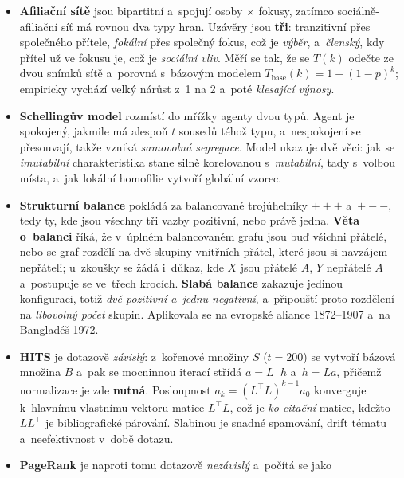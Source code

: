 \documentclass[11pt,a4paper]{article}
\theoremstyle{definition}
\begin{document}
\begin{itemize}
      \emph{Imutabilní} je pohlaví, rasa a~věk, \emph{mutabilní} je chování a~názory. Oba směry
      lze rozlišit jedině \emph{longitudinálními} studiemi; studie obezity (Christakis \&
      Fowler, 12\,000 lidí, 32 let) přinesla důkaz pro \emph{sociální vliv}.
\item \textbf{Afiliační sítě} jsou bipartitní a~spojují osoby $\times$ fokusy, zatímco
      sociálně-afiliační síť má rovnou dva typy hran. Uzávěry jsou \textbf{tři}: tranzitivní
      přes společného přítele, \emph{fokální} přes společný fokus, což je \emph{výběr},
      a~\emph{členský}, kdy přítel už ve fokusu je, což je \emph{sociální vliv}. Měří se tak, že
      se $T(k)$ odečte ze dvou snímků sítě a~porovná s~bázovým modelem
      $T_{\text{base}}(k)=1-(1-p)^k$; empiricky vychází velký nárůst z~1 na 2 a~poté
      \emph{klesající výnosy}.
\item \textbf{Schellingův model} rozmístí do mřížky agenty dvou typů. Agent je spokojený,
      jakmile má alespoň $t$ sousedů téhož typu, a~nespokojení se přesouvají, takže vzniká
      \emph{samovolná segregace}. Model ukazuje dvě věci: jak se \emph{imutabilní}
      charakteristika stane silně korelovanou s~\emph{mutabilní}, tady s~volbou místa, a~jak
      lokální homofilie vytvoří globální vzorec.
\item \textbf{Strukturní balance} pokládá za balancované trojúhelníky $+{+}{+}$ a~$+{-}{-}$,
      tedy ty, kde jsou všechny tři vazby pozitivní, nebo právě jedna. \textbf{Věta o~balanci}
      říká, že v~úplném balancovaném grafu jsou buď všichni přátelé, nebo se graf rozdělí na dvě
      skupiny vnitřních přátel, které jsou si navzájem nepřáteli; u~zkoušky se žádá i~důkaz, kde
      $X$ jsou přátelé $A$, $Y$ nepřátelé $A$ a~postupuje se ve~třech krocích. \textbf{Slabá
      balance} zakazuje jedinou konfiguraci, totiž \emph{dvě pozitivní a~jednu negativní},
      a~připouští proto rozdělení na \emph{libovolný počet} skupin. Aplikovala se na evropské
      aliance 1872--1907 a~na Bangladéš 1972.
\item \textbf{HITS} je dotazově \emph{závislý}: z~kořenové množiny $S$ ($t=200$) se vytvoří
      bázová množina $B$ a~pak se mocninnou iterací střídá $a=L^{\!\top}h$ a~$h=La$, přičemž
      normalizace je zde \textbf{nutná}. Posloupnost $a_k=(L^{\!\top}L)^{k-1}a_0$ konverguje
      k~hlavnímu vlastnímu vektoru matice $L^{\!\top}L$, což je \emph{ko-citační} matice,
      kdežto $LL^{\!\top}$ je bibliografické párování. Slabinou je snadné spamování, drift
      tématu a~neefektivnost v~době dotazu.
\item \textbf{PageRank} je naproti tomu dotazově \emph{nezávislý} a~počítá se jako

\end{itemize}
\end{document}
